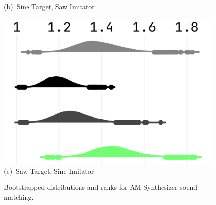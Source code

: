 \begin{figure}[t]
\begin{minipage}[t]{\textwidth}
\begin{minipage}[t]{0.91\textwidth}
\begin{minipage}[t]{0.31\textwidth}
        \vspace{0.3em}
        \footnotesize (b)~Sine Target, Saw Imitator
      \end{minipage}
      \hspace{0.015\textwidth}%
      \begin{minipage}[t]{0.31\textwidth}
        \centering
        \includegraphics[width=\linewidth]{images/npsk_ood_P_Loss_2.png}
        \vspace{0.3em}
        \footnotesize (c)~Saw Target, Sine Imitator
      \end{minipage}
    \end{minipage}
  \end{minipage}
  \caption{Bootstrapped distributions and ranks for AM-Synthesizer sound matching.}
  \label{fig:npsk_am_synths}
\end{figure}
